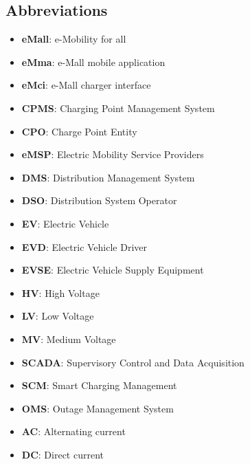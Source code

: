 \subsection{Abbreviations}
\begin{itemize}
    \item \textbf{eMall}: e-Mobility for all
    \item \textbf{eMma}: e-Mall mobile application
    \item \textbf{eMci}: e-Mall charger interface
    \item \textbf{CPMS}: Charging Point Management System
    \item \textbf{CPO}: Charge Point Entity
    \item \textbf{eMSP}: Electric Mobility Service Providers
    \item \textbf{DMS}: Distribution Management System
    \item \textbf{DSO}: Distribution System Operator
    \item \textbf{EV}: Electric Vehicle
    \item \textbf{EVD}: Electric Vehicle Driver
    \item \textbf{EVSE}: Electric Vehicle Supply Equipment
    \item \textbf{HV}: High Voltage
    \item \textbf{LV}: Low Voltage
    \item \textbf{MV}: Medium Voltage
    \item \textbf{SCADA}: Supervisory Control and Data Acquisition
    \item \textbf{SCM}: Smart Charging Management 
    \item \textbf{OMS}: Outage Management System
    \item \textbf{AC}: Alternating current
    \item \textbf{DC}: Direct current
\end{itemize}

